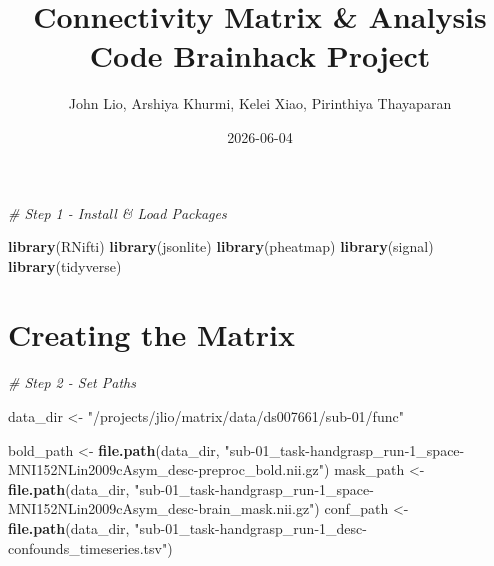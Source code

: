 \documentclass[
]{article}
\title{Connectivity Matrix \& Analysis Code Brainhack Project}
\author{John Lio, Arshiya Khurmi, Kelei Xiao, Pirinthiya Thayaparan}
\date{2026-06-04}
\newenvironment{Shaded}{\begin{snugshade}}{\end{snugshade}}
\newcommand{\CommentTok}[1]{\textcolor[rgb]{0.56,0.35,0.01}{\textit{#1}}}
\newcommand{\FunctionTok}[1]{\textcolor[rgb]{0.13,0.29,0.53}{\textbf{#1}}}
\newcommand{\NormalTok}[1]{#1}
\newcommand{\OtherTok}[1]{\textcolor[rgb]{0.56,0.35,0.01}{#1}}
\newcommand{\StringTok}[1]{\textcolor[rgb]{0.31,0.60,0.02}{#1}}
\begin{document}
\maketitle

\newpage

\begin{Shaded}
\begin{Highlighting}[]
\CommentTok{\# Step 1 {-} Install \& Load Packages }

\FunctionTok{library}\NormalTok{(RNifti)}
\FunctionTok{library}\NormalTok{(jsonlite)}
\FunctionTok{library}\NormalTok{(pheatmap)}
\FunctionTok{library}\NormalTok{(signal)}
\FunctionTok{library}\NormalTok{(tidyverse)}
\end{Highlighting}
\end{Shaded}

\section{Creating the Matrix}\label{creating-the-matrix}

\begin{Shaded}
\begin{Highlighting}[]
\CommentTok{\# Step 2 {-} Set Paths}

\NormalTok{data\_dir }\OtherTok{\textless{}{-}} \StringTok{"/projects/jlio/matrix/data/ds007661/sub{-}01/func"}

\NormalTok{bold\_path }\OtherTok{\textless{}{-}} \FunctionTok{file.path}\NormalTok{(data\_dir, }\StringTok{"sub{-}01\_task{-}handgrasp\_run{-}1\_space{-}MNI152NLin2009cAsym\_desc{-}preproc\_bold.nii.gz"}\NormalTok{)}
\NormalTok{mask\_path }\OtherTok{\textless{}{-}} \FunctionTok{file.path}\NormalTok{(data\_dir, }\StringTok{"sub{-}01\_task{-}handgrasp\_run{-}1\_space{-}MNI152NLin2009cAsym\_desc{-}brain\_mask.nii.gz"}\NormalTok{)}
\NormalTok{conf\_path }\OtherTok{\textless{}{-}} \FunctionTok{file.path}\NormalTok{(data\_dir, }\StringTok{"sub{-}01\_task{-}handgrasp\_run{-}1\_desc{-}confounds\_timeseries.tsv"}\NormalTok{)}
\end{Highlighting}
\end{Shaded}
\end{document}
